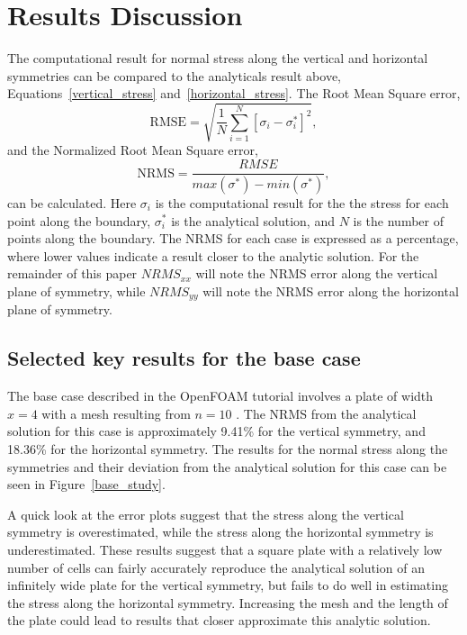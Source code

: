 \documentclass[twocolumn,10pt]{asme2ej}
\begin{document}
\section{Results Discussion}
The computational result for normal stress along the vertical and horizontal symmetries can be compared to the analyticals result above, Equations~\ref{vertical_stress} and~\ref{horizontal_stress}. The Root Mean Square error,
\begin{equation}
\mbox{RMSE} = \sqrt{\frac{1}{N}\sum\limits_{i=1}^N[\sigma_i - \sigma^*_i]^2},
\end{equation}
and the Normalized Root Mean Square error,
\begin{equation}
\mbox{NRMS} = \dfrac{RMSE}{max(\sigma^*)-min(\sigma^*)},
\end{equation}
can be calculated. Here $\sigma_i$ is the computational result for the the stress for each point along the boundary, $\sigma^*_i$ is the analytical solution, and $N$ is the number of points along the boundary. The NRMS for each case is expressed as a percentage, where lower values indicate a result closer to the analytic solution. For the remainder of this paper $NRMS_{xx}$ will note the NRMS error along the vertical plane of symmetry, while $NRMS_{yy}$ will note the NRMS error along the horizontal plane of symmetry.

\subsection{Selected key results for the base case}
The base case described in the OpenFOAM tutorial involves a plate of width $x = 4$ with a mesh resulting from $n = 10$ \cite{ctfm_1}. The NRMS from the analytical solution for this case is approximately 9.41\% for the vertical symmetry, and 18.36\% for the horizontal symmetry. The results for the normal stress along the symmetries and their deviation from the analytical solution for this case can be seen in Figure~\ref{base_study}.

A quick look at the error plots suggest that the stress along the vertical symmetry is overestimated, while the stress along the horizontal symmetry is underestimated. These results suggest that a square plate with a relatively low number of cells can fairly accurately reproduce the analytical solution of an infinitely wide plate for the vertical symmetry, but fails to do well in estimating the stress along the horizontal symmetry. Increasing the mesh and the length of the plate could lead to results that closer approximate this analytic solution.
\end{document}
